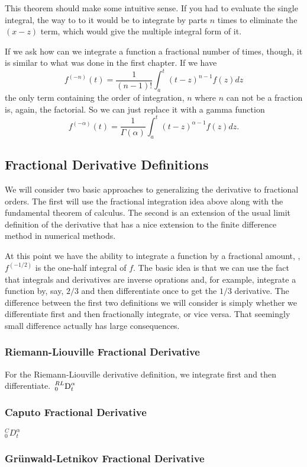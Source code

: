 This theorem should make some intuitive sense. If you had to evaluate the single integral, the way to to it would be to integrate by parts $n$ times to eliminate the $(x - z)$ term, which would give the multiple integral form of it.

If we ask how can we integrate a function a fractional number of times, though, it is similar to what was done in the first chapter. If we have
\begin{equation*}
  f^{(-n)}(t) = \frac{1}{\left( n - 1 \right)!} \int_a^t \left( t - z \right)^{n-1} f(z) dz
\end{equation*}
the only term containing the order of integration, $n$ where $n$ can not be a fraction is, again, the factorial. So we can just replace it with a gamma function 
\begin{equation}
  \boxed{ f^{(-\alpha)}(t) = \frac{1}{\Gamma \left( \alpha \right)} \int_a^t \left( t - z \right)^{\alpha-1} f(z) dz. }
  \label{eq:fracint}
\end{equation}

\subsection{Fractional Derivative Definitions}

We will consider two basic approaches to generalizing the derivative to fractional orders. The first will use the fractional integration idea above along with the fundamental theorem of calculus. The second is an extension of the usual limit definition of the derivative that has a nice extension to the finite difference method in numerical methods.

At this point we have the ability to integrate a function by a fractional amount, \eg, $f^{\left( -1/2 \right)}$ is the one-half integral of $f$. The basic idea is that we can use the fact that integrals and derivatives are inverse oprations and, for example, integrate a function by, say, $2/3$ and then differentiate once to get the $1/3$ derivative. The difference between the first two definitions we will consider is simply whether we differentiate first and then fractionally integrate, or vice versa. That seemingly small difference actually has large consequences.

\subsubsection{Riemann-Liouville Fractional Derivative}

For the Riemann-Liouville derivative definition, we integrate first and then differentiate. $\sideset{^{RL}_0}{^\alpha_t}\D$

\subsubsection{Caputo Fractional Derivative}
$^C_0D^\alpha_t$

\subsubsection{Gr\"unwald-Letnikov Fractional Derivative}
